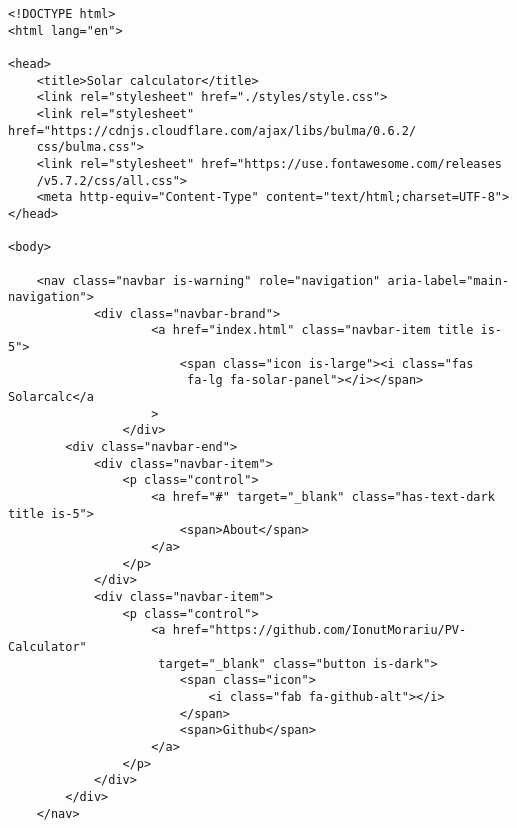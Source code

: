 \begin{lstlisting}[style=ES6, caption={public/index.html}]
<!DOCTYPE html>
<html lang="en">

<head>
    <title>Solar calculator</title>
    <link rel="stylesheet" href="./styles/style.css">
    <link rel="stylesheet" href="https://cdnjs.cloudflare.com/ajax/libs/bulma/0.6.2/
    css/bulma.css">
    <link rel="stylesheet" href="https://use.fontawesome.com/releases
    /v5.7.2/css/all.css">
    <meta http-equiv="Content-Type" content="text/html;charset=UTF-8">
</head>

<body>

    <nav class="navbar is-warning" role="navigation" aria-label="main-navigation">
			<div class="navbar-brand">
                    <a href="index.html" class="navbar-item title is-5">
                        <span class="icon is-large"><i class="fas
                         fa-lg fa-solar-panel"></i></span> Solarcalc</a
                    >
                </div>
        <div class="navbar-end">
            <div class="navbar-item">
                <p class="control">
                    <a href="#" target="_blank" class="has-text-dark title is-5">
                        <span>About</span>
                    </a>
                </p>
            </div>
            <div class="navbar-item">
                <p class="control">
                    <a href="https://github.com/IonutMorariu/PV-Calculator"
                     target="_blank" class="button is-dark">
                        <span class="icon">
                            <i class="fab fa-github-alt"></i>
                        </span>
                        <span>Github</span>
                    </a>
                </p>
            </div>
        </div>
    </nav>


\end{lstlisting}
